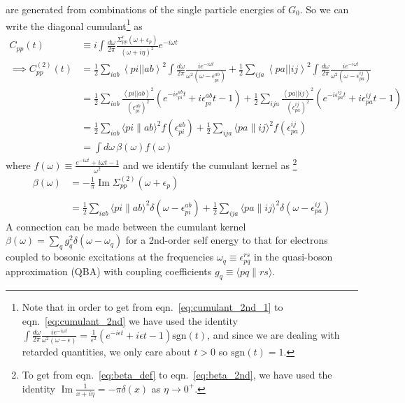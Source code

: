 are generated from combinations of the single particle energies of $G_0$. So we can write the diagonal cumulant\footnote{ 
Note that in order to get from eqn.~\ref{eq:cumulant_2nd_1} to eqn.~\ref{eq:cumulant_2nd} we have used the identity $\int \frac{d\omega}{2\pi} \frac{i e^{-i \omega t}}{\omega^2\left(\omega-\epsilon\right)} = \frac{1}{\epsilon^2} \left(e^{-i \epsilon t} +i \epsilon t -1 \right) \mathrm{sgn}(t)$, and since we are dealing with retarded quantities, we only care about $t>0$ so $\mathrm{sgn}(t) = 1$.} as
\begin{align}
C_{pp}(t) &\equiv i \int \frac{d\omega}{2\pi} \frac{ \Sigma_{pp}^c\left(\omega+\epsilon_p\right)}{(\omega + i \eta)^2} e^{-i \omega t} \\
\implies C_{pp}^{(2)}(t) &= \frac{1}{2} \sum_{iab} \left< pi \left| \right| ab \right>^2 \int \frac{d\omega}{2\pi} \frac{i e^{-i \omega t}}{\omega^2\left(\omega-\epsilon_{pi}^{ab}\right)} + \frac{1}{2} \sum_{ija} \left< pa \left| \right| ij \right>^2 \int \frac{d\omega}{2\pi} \frac{i e^{-i \omega t}}{\omega^2\left(\omega-\epsilon_{pa}^{ij}\right)} 
\label{eq:cumulant_2nd_1}
\\
&= \frac{1}{2}\sum_{iab} \frac{\left< pi \left| \right| ab \right>^2}{\left(\epsilon_{pi}^{ab}\right)^2}
\left(e^{-i \epsilon_{pi}^{ab} t} +i \epsilon_{pi}^{ab} t -1 \right)
+\frac{1}{2}\sum_{ija} \frac{\left< pa \left| \right| ij \right>^2}{\left(\epsilon_{pa}^{ij}\right)^2}
\left(e^{-i \epsilon_{pa}^{ij} t} +i \epsilon_{pa}^{ij} t -1 \right) 
\label{eq:cumulant_2nd}
\\
&= \frac{1}{2} \sum_{i a b}\langle p i \| a b\rangle^2 f\left(\epsilon_{p i}^{a b}\right)+\frac{1}{2} \sum_{i j a}\langle p a \| i j\rangle^2 f\left(\epsilon_{p a}^{i j}\right)\label{eq:cumulant_2nd_2}\\
&= \int d\omega\, \beta(\omega) f(\omega)
\end{align}
where $f(\omega) \equiv \frac{e^{-i \omega t}+i \omega t-1}{\omega^2} $ and we identify the cumulant kernel as
\footnote{To get from eqn.~\ref{eq:beta_def} to eqn.~\ref{eq:beta_2nd}, we have used the identity $\operatorname{Im} \frac{1}{x + i \eta} = -\pi \delta(x)$ as $\eta \to 0^+$.}
\begin{align}
    \beta(\omega) &= -\frac{1}{\pi} \operatorname{Im} \Sigma_{pp}^{(2)}\left(\omega+\epsilon_p\right) 
\label{eq:beta_def}\\
\\
&=\frac{1}{2} \sum_{i a b}\langle p i \| a b\rangle^2 \delta\left(\omega-\epsilon_{p i}^{a b}\right)+\frac{1}{2} \sum_{i j a}\langle p a \| i j\rangle^2 \delta\left(\omega-\epsilon_{p a}^{i j}\right) \label{eq:beta_2nd}
\end{align}
A connection can be made between the cumulant kernel $\beta(\omega)=\sum_q g_q^2 \delta(\omega-\omega_q)$ for a 2nd-order self energy  to that for electrons coupled to
bosonic excitations at the frequencies $\omega_q\equiv \epsilon_{pq}^{rs}$ in the quasi-boson approximation (QBA)
with coupling coefficients $g_q \equiv \langle p q \| r s\rangle$. 
